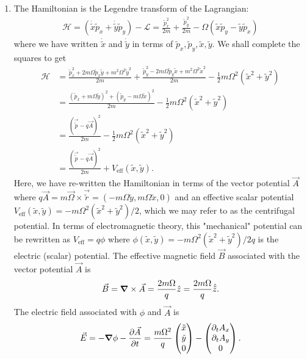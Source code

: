 \documentclass{article}
\theoremstyle{definition}
\newcommand{\p}{\partial}
\newcommand{\lag}{\mathcal{L}}
\newcommand{\ham}{\mathcal{H}}
\newcommand{\f}[2]{\frac{#1}{#2}}
\newcommand{\lp}{\left(}
\newcommand{\rp}{\right)}
\begin{document}
\begin{enumerate}[label=\alph*)]
	\item The Hamiltonian is the Legendre transform of the Lagrangian:
	\begin{align*}
		\ham 
		= \lp \dot{\tilde{x}}\tilde{p}_x + \dot{\tilde{y}}\tilde{p}_y \rp - \lag 
		= \f{\tilde{p}_x^2}{2m} +\f{\tilde{p}_y^2}{2m} - \Omega (\tilde{x}  \tilde{p}_y  -  \tilde{y} \tilde{p}_x)
	\end{align*}
	where we have written $\dot{\tilde{x}}$ and $\dot{\tilde{y}}$ in terms of $\tilde{p}_x,\tilde{p}_y,\tilde{x},\tilde{y}$. We shall complete the squares to get
	\begin{align*}
		\ham 
		&= \f{\tilde{p}_x^2 + 2 m\Omega \tilde{p}_x\tilde{y} + m^2\Omega^2 \tilde{y}^2}{2m} + 
		\f{\tilde{p}_y^2 - 2 m\Omega \tilde{p}_y\tilde{x} + m^2\Omega^2 \tilde{x}^2}{2m} - \f{1}{2}m\Omega^2 (\tilde{x}^2 + \tilde{y}^2) \\ 
		&= \f{(\tilde{p}_x + m\Omega \tilde{y})^2 + (\tilde{p}_y - m\Omega \tilde{x})^2}{2m} - \f{1}{2}m\Omega^2 (\tilde{x}^2 + \tilde{y}^2) \\
		&= \f{(\vec{\tilde{p}} - q\vec{A})^2}{2m}  - \f{1}{2}m\Omega^2 (\tilde{x}^2 + \tilde{y}^2)\\
		&= \f{(\vec{\tilde{p}} - q\vec{A})^2}{2m} + V_\text{eff}(\tilde{x}, \tilde{y}).
	\end{align*}
	Here, we have re-written the Hamiltonian in terms of the vector potential $\vec{A}$ where $q\vec{A} = m \vec{\Omega} \times \vec{\tilde{r}} = (-m\Omega \tilde{y}, m\Omega \tilde{x},0)$ and an effective scalar potential $V_\text{eff}(\tilde{x}, \tilde{y}) = -m\Omega^2 (\tilde{x}^2 + \tilde{y}^2)/2$, which we may refer to as the centrifugal potential. In terms of electromagnetic theory, this "mechanical" potential can be rewritten as $V_\text{eff}= q \phi$ where $\phi(\tilde{x},\tilde{y}) =  -m\Omega^2 (\tilde{x}^2 + \tilde{y}^2)/2q$ is the electric (scalar) potential. The effective magnetic field $\vec{B}$ associated with the vector potential $\vec{A}$ is 
	\begin{align*}
		\vec{B} = \grad \times \vec{A} = \f{2m\Omega}{q} \hat{z} = \f{2m\Omega}{q} \hat{\tilde{z}}.
	\end{align*}
	The electric field associated with $\phi$ and $\vec{A}$ is 
	\begin{align*}
		\vec{E} =  - \grad \phi - \f{\p \vec{A}}{\p t} = \f{m\Omega^2}{q}\begin{pmatrix}
			\tilde{x} \\ \tilde{y} \\ 0
		\end{pmatrix}
	- \begin{pmatrix}
		\p_t A_x \\ \p_t A_y \\ 0
	\end{pmatrix}.
	\end{align*}



\end{enumerate}
\end{document}
